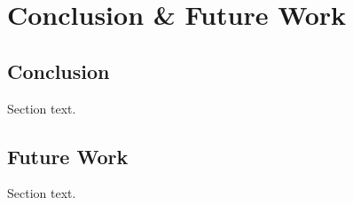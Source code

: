 \chapter{Conclusion \& Future Work}\label{chap:concl}

\section{Conclusion}
Section text.

\section{Future Work}

Section text.